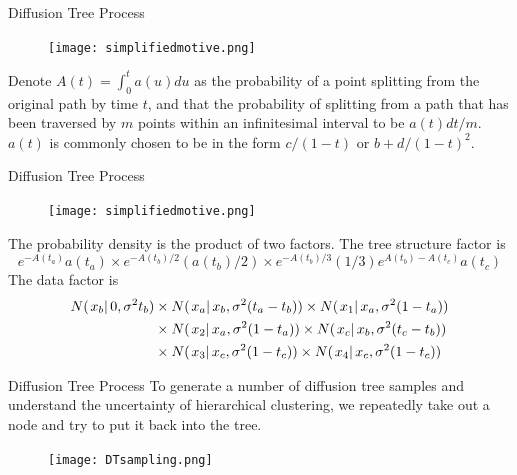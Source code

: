 \documentclass{beamer}
\begin{document}
	\begin{frame}{Diffusion Tree Process}
	\begin{figure}[htbp]
			\centering
			\texttt{[image: simplifiedmotive.png]}
		\end{figure}
		
		Denote $A(t) = \int_{0}^{t}a(u)du$ as the probability of a point splitting from the original path by time $t$, and that the probability of splitting from a path that has been traversed by $m$ points within an infinitesimal interval to be $a(t)dt/m$. $a(t)$ is commonly chosen to be in the form $c/(1-t)$ or $b+d/(1-t)^2$.
		
	\end{frame}

	\begin{frame}{Diffusion Tree Process}
	
	\begin{figure}[htbp]
			\centering
			\texttt{[image: simplifiedmotive.png]}
		\end{figure}	
	
	The probability density is the product of two factors. The tree structure factor is
	$$ e^{-A(t_a)} a(t_a) \times e^{-A(t_b)/2}(a(t_b)/2)\times e^{-A(t_b)/3}(1/3)e^{A(t_b) - A(t_c)}a(t_c) $$
	The data factor is
	\begin{align*}
	\small
		N(\left.x_b \right\vert 0, \sigma^2 t_b) & \times N(\left.x_a \right\vert x_b, \sigma^2 (t_a - t_b)) \times N(\left.x_1 \right\vert x_a ,\sigma^2 (1-t_a))\\ & \times N(\left.x_2 \right\vert x_a, \sigma^2 (1-t_a)) 
		\times N(\left.x_c \right\vert x_b, \sigma^2 (t_c - t_b))\\ & \times N(\left.x_3 \right\vert x_c ,\sigma^2 (1-t_c)) \times N(\left.x_4 \right\vert x_c, \sigma^2 (1-t_c))
	\end{align*}
	\end{frame}

	\begin{frame} {Diffusion Tree Process}
		To generate a number of diffusion tree samples and understand the uncertainty of hierarchical clustering, we repeatedly take out a node and try to put it back into the tree.
		
		\begin{figure}[htbp]
			\centering
			\texttt{[image: DTsampling.png]}
		\end{figure}
	\end{frame}
\end{document}
